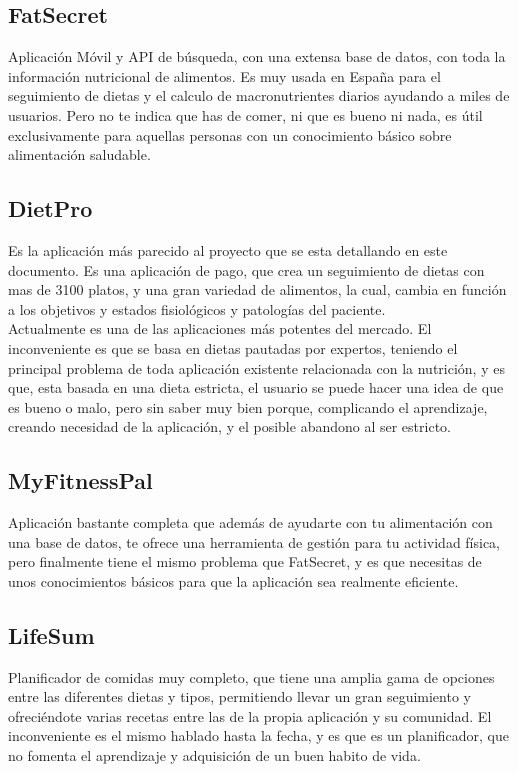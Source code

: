 \subsection{FatSecret}
Aplicación Móvil y API de búsqueda, con una extensa base de datos, con toda la información nutricional de alimentos. Es muy usada en España para el seguimiento de dietas y el calculo de macronutrientes diarios ayudando a miles de usuarios. Pero no te indica que has de comer, ni que es bueno ni nada, es útil exclusivamente para aquellas personas con un conocimiento básico sobre alimentación saludable. \\
\subsection{DietPro}
Es la aplicación más parecido al proyecto que se esta detallando en este documento. Es una aplicación de pago, que crea un seguimiento de dietas con mas de 3100 platos, y una gran variedad de alimentos, la cual, cambia en función a los objetivos y estados fisiológicos y patologías del paciente.\\
Actualmente es una de las aplicaciones más potentes del mercado. El inconveniente es que se basa en dietas pautadas por expertos, teniendo el principal problema de toda aplicación existente relacionada con la nutrición, y es que, esta basada en una dieta estricta, el usuario se puede hacer una idea de que es bueno o malo, pero sin saber muy bien porque, complicando el aprendizaje, creando necesidad de la aplicación, y el posible abandono al ser estricto.\\
\subsection{MyFitnessPal}
Aplicación bastante completa que además de ayudarte con tu alimentación con una base de datos, te ofrece una herramienta de gestión para tu actividad física, pero finalmente tiene el mismo problema que FatSecret, y es que necesitas de unos conocimientos básicos para que la aplicación sea realmente eficiente.\\
\subsection{LifeSum}
Planificador de comidas muy completo, que tiene una amplia gama de opciones entre las diferentes dietas y tipos, permitiendo llevar un gran seguimiento y ofreciéndote varias recetas entre las de la propia aplicación y su comunidad. El inconveniente es el mismo hablado hasta la fecha, y es que es un planificador, que no fomenta el aprendizaje y adquisición de un buen habito de vida. 
	
